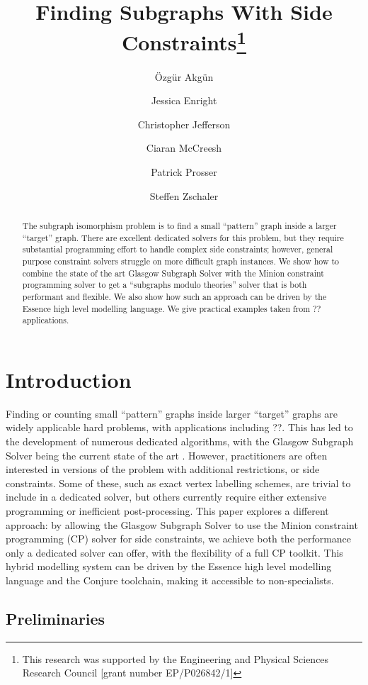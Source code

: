 \documentclass[runningheads]{llncs}
\title{Finding Subgraphs With Side Constraints\thanks{This research was supported by the
Engineering and Physical Sciences Research Council [grant number EP/P026842/1]}}
\author{
    \"Ozg\"ur Akg\"un\inst{1} \and Jessica Enright\inst{2} \and Christopher
    Jefferson\inst{1} \and Ciaran McCreesh\inst{2} \and Patrick
    Prosser\inst{3} \and Steffen Zschaler\inst{4} \\
}
\institute{
    University of St Andrews, Scotland \and
    University of Glasgow, Scotland \\ \email{ciaran.mccreesh@glasgow.ac.uk} \and
    Algorithmicists Anonymous, Scotland \and
    King's College London, England
}
\begin{document}
\maketitle

\begin{abstract}
    The subgraph isomorphism problem is to find a small ``pattern'' graph inside a larger ``target''
    graph. There are excellent dedicated solvers for this problem, but they require substantial
    programming effort to handle complex side constraints; however, general purpose constraint
    solvers struggle on more difficult graph instances. We show how to combine the state of the art
    Glasgow Subgraph Solver with the Minion constraint programming solver to get a ``subgraphs modulo
    theories'' solver that is both performant and flexible. We also show how such an approach can be
    driven by the Essence high level modelling language. We give practical examples taken from
    ??applications.
\end{abstract}

\section{Introduction}

Finding or counting small ``pattern'' graphs inside larger ``target'' graphs are widely applicable
hard problems, with applications including ??. This has led to the development of numerous dedicated
algorithms, with the Glasgow Subgraph Solver \cite{DBLP:conf/gg/McCreeshP020} being the current
state of the art \cite{DBLP:conf/gbrpr/Solnon19}. However, practitioners are often interested in
versions of the problem with additional restrictions, or side constraints. Some of these, such as
exact vertex labelling schemes, are trivial to include in a dedicated solver, but others currently
require either extensive programming or inefficient post-processing. This paper explores a different
approach: by allowing the Glasgow Subgraph Solver to use the Minion constraint programming (CP) solver
\cite{DBLP:conf/ecai/GentJM06} for side constraints, we achieve both the performance only a
dedicated solver can offer, with the flexibility of a full CP toolkit. This
hybrid modelling system can be driven by the Essence high level modelling language
\cite{DBLP:journals/constraints/FrischHJHM08} and the Conjure toolchain, making it accessible to
non-specialists.

\subsection{Preliminaries}
\end{document}
